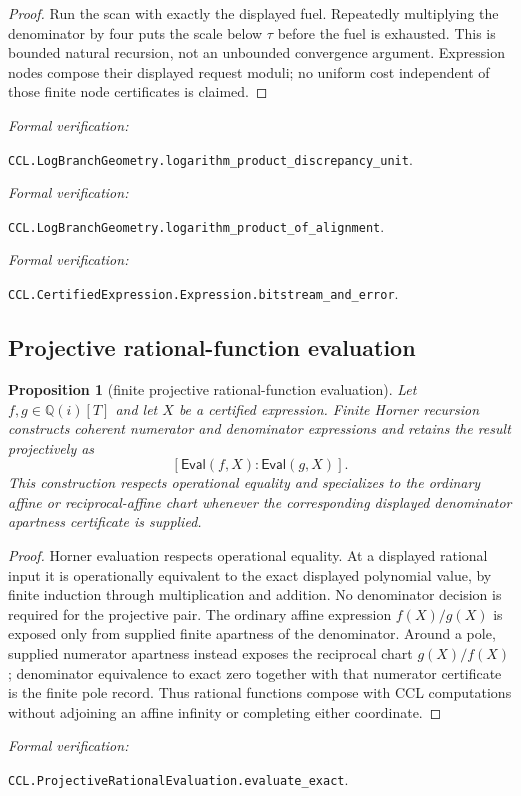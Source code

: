 \documentclass[10pt]{article}
\newtheorem{proposition}[theorem]{Proposition}
\theoremstyle{definition}
\theoremstyle{remark}
\newcommand{\Qi}{\mathbb{Q}(i)}
\newcommand{\leanref}[1]{\par\smallskip\noindent
  \emph{Formal verification:}\par\nobreak
  {\raggedright\nolinkurl{#1}.\par}}
\begin{document}
\begin{proof}
Run the scan with exactly the displayed fuel.  Repeatedly multiplying the
denominator by four puts the scale below $\tau$ before the fuel is exhausted.
This is bounded natural recursion, not an unbounded convergence argument.
Expression nodes compose their displayed request moduli; no uniform cost
independent of those finite node certificates is claimed.
\end{proof}

\leanref{CCL.LogBranchGeometry.logarithm_product_discrepancy_unit}
\leanref{CCL.LogBranchGeometry.logarithm_product_of_alignment}
\leanref{CCL.CertifiedExpression.Expression.bitstream_and_error}

\subsection{Projective rational-function evaluation}

\begin{proposition}[finite projective rational-function evaluation]
\label{prop:projective-rational-evaluation}
Let $f,g\in\Qi[T]$ and let $X$ be a certified expression.  Finite Horner
recursion constructs coherent numerator and denominator expressions and
retains the result projectively as
\[
 [\mathsf{Eval}(f,X):\mathsf{Eval}(g,X)].
 \tag{3.31l}
\]
This construction respects operational equality and specializes to the
ordinary affine or reciprocal-affine chart whenever the corresponding
displayed denominator apartness certificate is supplied.
\end{proposition}

\begin{proof}
Horner evaluation respects operational equality.  At a displayed rational
input it is operationally equivalent to the exact displayed polynomial
value, by finite induction through multiplication and addition.  No
denominator decision is required for the projective pair.  The ordinary
affine expression $f(X)/g(X)$ is exposed only from supplied finite apartness
of the denominator.  Around a pole, supplied numerator apartness instead
exposes the reciprocal chart $g(X)/f(X)$; denominator equivalence to exact
zero together with that numerator certificate is the finite pole record.
Thus rational functions compose with CCL computations without adjoining an
affine infinity or completing either coordinate.
\end{proof}

\leanref{CCL.ProjectiveRationalEvaluation.evaluate_exact}
\end{document}
